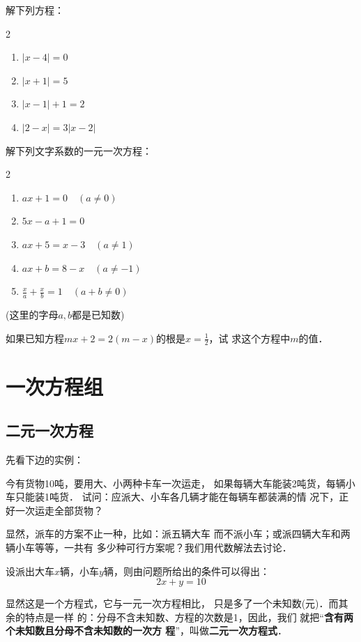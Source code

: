 \begin{enumerate}
\staritem 解下列方程：
\begin{multicols}{2}
\begin{enumerate}
    \item $|x-4|=0$
    \item $|x+1|=5$
    \item $|x-1|+1=2$
    \item $|2-x|=3|x-2|$
\end{enumerate}
\end{multicols}

\staritem 解下列文字系数的一元一次方程：
\begin{multicols}{2}
    \begin{enumerate}
        \item $ax+1=0\quad (a\ne 0)$
        \item $5x-a+1=0$
        \item $ax+5=x-3\quad (a\ne 1)$
        \item $ax+b=8-x\quad (a\ne -1)$
        \item $\frac{x}{a}+\frac{x}{b}=1\quad (a+b\ne 0)$
    \end{enumerate}
    (这里的字母$a,b$都是已知数)
    \end{multicols}

    \staritem 如果已知方程$mx+2=2(m-x)$的根是$x=\frac{1}{2}$，试
求这个方程中$m$的值．
\end{enumerate}


\section{一次方程组}
\subsection{二元一次方程}
    先看下边的实例：

    今有货物10吨，要用大、小两种卡车一次运走，
如果每辆大车能装2吨货，每辆小车只能装1吨货．
试问：应派大、小车各几辆才能在每辆车都装满的情
况下，正好一次运走全部货物？
    
显然，派车的方案不止一种，比如：派五辆大车
而不派小车；或派四辆大车和两辆小车等等，一共有
多少种可行方案呢？我们用代数解法去讨论．

设派出大车$x$辆，小车$y$辆，则由问题所给出的条件可以得出：
\begin{equation}
    2x+y=10
\end{equation}

显然这是一个方程式，它与一元一次方程相比，
只是多了一个未知数(元)．而其余的特点是一样
的：分母不含未知数、方程的次数是1，因此，我们
就把“\textbf{含有两个未知数且分母不含未知数的一次方
程}”，叫做\textbf{二元一次方程式}．

